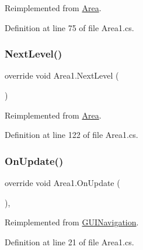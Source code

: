 Reimplemented from \mbox{\hyperlink{class_area_a96ef46550ca800c223f4db8f0b93e86b}{Area}}.



Definition at line 75 of file Area1.\+cs.

\mbox{\label{class_area1_a232eae9b5f4ebdc861d036654b947303}} 
\subsubsection{\texorpdfstring{Next\+Level()}{NextLevel()}}
{\footnotesize\ttfamily override void Area1.\+Next\+Level (\begin{DoxyParamCaption}{ }\end{DoxyParamCaption})\hspace{0.3cm}{\ttfamily [virtual]}}



Reimplemented from \mbox{\hyperlink{class_area_a097fdec8cbc515c14e45de2c9cd07046}{Area}}.



Definition at line 122 of file Area1.\+cs.

\mbox{\label{class_area1_a036218e5cf822f13d2e923e0e1100ecf}} 
\subsubsection{\texorpdfstring{On\+Update()}{OnUpdate()}}
{\footnotesize\ttfamily override void Area1.\+On\+Update (\begin{DoxyParamCaption}{ }\end{DoxyParamCaption})\hspace{0.3cm}{\ttfamily [protected]}, {\ttfamily [virtual]}}



Reimplemented from \mbox{\hyperlink{class_g_u_i_navigation_aad668226e400889bceea3914750b949e}{G\+U\+I\+Navigation}}.



Definition at line 21 of file Area1.\+cs.

\mbox{\label{class_area1_af49f1117a0338b89224481a3708b57d9}} 
